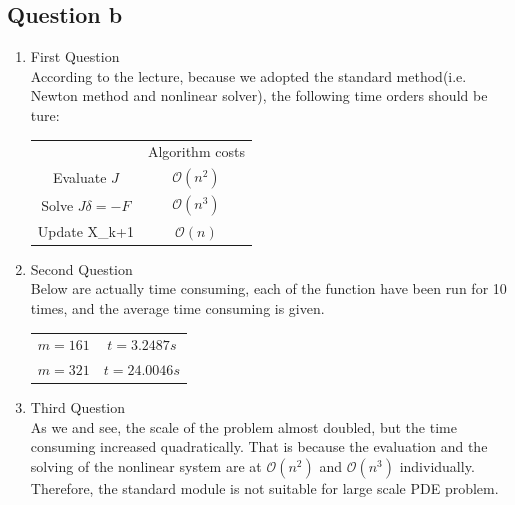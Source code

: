 \documentclass[11pt]{article}
\begin{document}
    \subsection{Question b}
    \begin{enumerate}
    \item First Question \\
    According to the lecture, because we adopted the standard method(i.e. Newton method and nonlinear solver), the following time orders should be ture:
    
    \begin{center}
    \begin{tabular}{c c}
     & Algorithm costs\\
    Evaluate $J$ & $\mathcal{O}(n^2)$ \\
    Solve $J\delta = -F$ & $\mathcal{O}(n^3)$\\
    Update X_{k+1} & $\mathcal{O}(n)$
    \end{tabular}
    \end{center}
    \item Second Question \\
    Below are actually time consuming, each of the function have been run for 10 times, and the average time consuming is given.
    \begin{center}
    \begin{tabular}{c c}
    $ m = 161$ & $ t = 3.2487s$\\
    $ m = 321$ & $ t = 24.0046s$
    \end{tabular}
    \end{center}
    \item Third Question \\
    As we and see, the scale of the problem almost doubled, but the time consuming increased quadratically. That is because the evaluation and the solving of the nonlinear system are at $\mathcal{O}(n^2)$ and   $\mathcal{O}(n^3)$ individually. Therefore, the standard module is not suitable for large scale PDE problem.  
    \end{enumerate}
\end{document}
